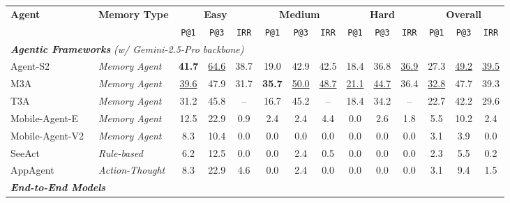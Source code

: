 \begin{table}[t]
  \centering
  \footnotesize
  \renewcommand{\arraystretch}{1.06}
  \setlength{\tabcolsep}{3.2pt}
  \begin{adjustbox}{max width=\textwidth}
  \begin{tabular}{@{}ll | ccc | ccc | ccc | ccc@{}}
    \toprule
    \multirow{2}{*}{\textbf{Agent}} & \multirow{2}{*}{\textbf{Memory Type}} &
      \multicolumn{3}{c|}{\textbf{Easy}} &
      \multicolumn{3}{c|}{\textbf{Medium}} &
      \multicolumn{3}{c|}{\textbf{Hard}} &
      \multicolumn{3}{c}{\textbf{Overall}} \\
    \cmidrule(lr){3-5} \cmidrule(lr){6-8} \cmidrule(lr){9-11} \cmidrule(l){12-14}
    & & \texttt{P@1} & \texttt{P@3} & \texttt{IRR} & \texttt{P@1} & \texttt{P@3} & \texttt{IRR} & \texttt{P@1} & \texttt{P@3} & \texttt{IRR} & \texttt{P@1} & \texttt{P@3} & \texttt{IRR} \\
    \midrule
    \multicolumn{14}{l}{\textit{\textbf{Agentic Frameworks}} \textit{(w/ Gemini-2.5-Pro backbone)}} \\
    \midrule
    Agent-S2~\cite{agashe2025agent} & \textit{Memory Agent} & \textbf{41.7} & \underline{64.6} & 38.7 & 19.0 & 42.9 & 42.5 & 18.4 & 36.8 & \underline{36.9} & 27.3 & \underline{49.2} & \underline{39.5} \\
    M3A~\cite{rawles2025androidworld} & \textit{Memory Agent} & \underline{39.6} & 47.9 & 31.7 & \textbf{35.7} & \underline{50.0} & \underline{48.7} & \underline{21.1} & \underline{44.7} & 36.4 & \underline{32.8} & 47.7 & 39.3 \\
    T3A~\cite{rawles2025androidworld} & \textit{Memory Agent} & 31.2 & 45.8 & -- & 16.7 & 45.2 & -- & 18.4 & 34.2 & -- & 22.7 & 42.2 & 29.6 \\
    Mobile-Agent-E~\cite{wang2025mobileagentselfevolving} & \textit{Memory Agent} & 12.5 & 22.9 & 0.9 & 2.4 & 2.4 & 4.4 & 0.0 & 2.6 & 1.8 & 5.5 & 10.2 & 2.4 \\
    Mobile-Agent-V2~\cite{wang2024mobile} & \textit{Memory Agent} & 8.3 & 10.4 & 0.0 & 0.0 & 0.0 & 0.0 & 0.0 & 0.0 & 0.0 & 3.1 & 3.9 & 0.0 \\
    SeeAct~\cite{zheng2024seeact} & \textit{Rule-based} & 6.2 & 12.5 & 0.0 & 0.0 & 2.4 & 0.5 & 0.0 & 0.0 & 0.0 & 2.3 & 5.5 & 0.2 \\
    AppAgent~\cite{zhang2025appagent} & \textit{Action-Thought} & 8.3 & 22.9 & 4.6 & 0.0 & 2.4 & 0.0 & 0.0 & 0.0 & 0.0 & 3.1 & 9.4 & 1.5 \\
    \midrule
    \multicolumn{14}{l}{\textit{\textbf{End-to-End Models}}} \\

\end{tabular}
\end{adjustbox}
\end{table}
